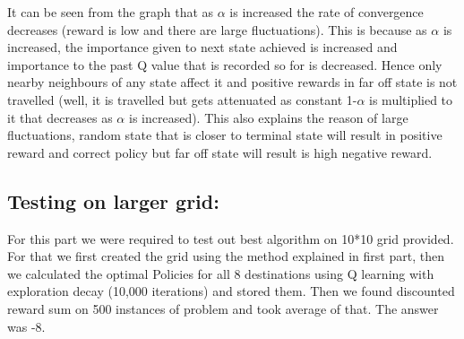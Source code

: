 \documentclass{article}
\begin{document}
\begin{enumerate}[a)]
\begin{enumerate}
    It can be seen from the graph that as $\alpha$ is increased the rate of convergence decreases (reward is low and there are large fluctuations). This is because as $\alpha$ is 
    increased, the importance given to next state achieved is increased and importance to the past Q value that is recorded so for is decreased. Hence only nearby neighbours of any 
    state affect it and positive rewards in far off state is not travelled (well, it is travelled but gets attenuated as constant 1-$\alpha$ is multiplied to it that decreases as $\alpha$ is increased).
    This also explains the reason of large fluctuations, random state that is closer to terminal state will result in positive reward and correct policy but far off state will result is high negative reward.

\end{enumerate}


\subsection{Testing on larger grid:}
For this part we were required to test out best algorithm on 10*10 grid provided. For that we first created the grid using the method explained in first part, then we calculated the optimal Policies for all 8 destinations using Q learning with 
exploration decay (10,000 iterations) and stored them. Then we found discounted reward sum on 500 instances of problem and took average of that. The answer was -8.

\end{enumerate}
\end{document}

